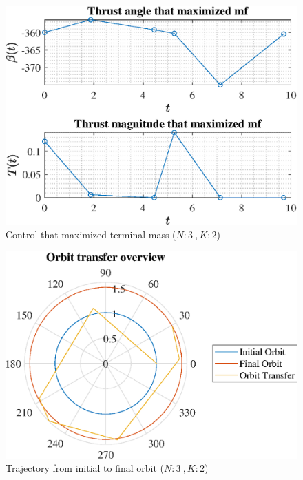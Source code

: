 \documentclass[]{article}
\begin{document}
	\begin{figure}
		\centering
		\includegraphics[scale=0.75]{control_N3_K2_C2_mf.eps}
		\caption{Control that maximized terminal mass (\(N:3\ , K:2\))}
		\label{fig:control_N3_K2_C2_mf}
	\end{figure}
	\begin{figure}
		\centering
		\includegraphics[scale=0.75]{orbit_N3_K2_C2_mf.eps}
		\caption{Trajectory from initial to final orbit (\(N:3\ , K:2\))}
		\label{fig:orbit_N3_K2_C2_mf}
	\end{figure}
\end{document}
